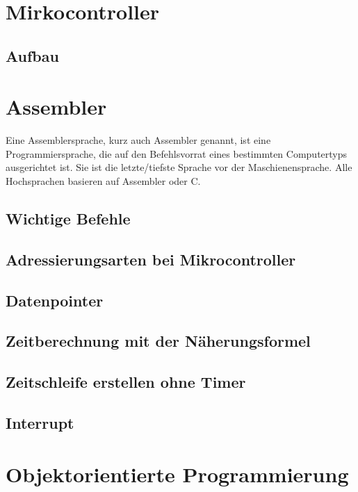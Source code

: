 \documentclass[12pt,a4paper]{article}
\begin{document}
\section{Mirkocontroller}

\subsection{Aufbau}

\section{Assembler}
    Eine Assemblersprache, kurz auch Assembler genannt, ist eine Programmiersprache, die auf den Befehlsvorrat eines
    bestimmten Computertyps ausgerichtet ist. Sie ist die letzte/tiefste Sprache vor der Maschienensprache. Alle Hochsprachen basieren auf Assembler oder C.

\subsection{Wichtige Befehle}

\subsection{Adressierungsarten bei Mikrocontroller}

\subsection{Datenpointer}

\subsection{Zeitberechnung mit der Näherungsformel}

\subsection{Zeitschleife erstellen ohne Timer}

\subsection{Interrupt}

\section{Objektorientierte Programmierung}
\end{document}
